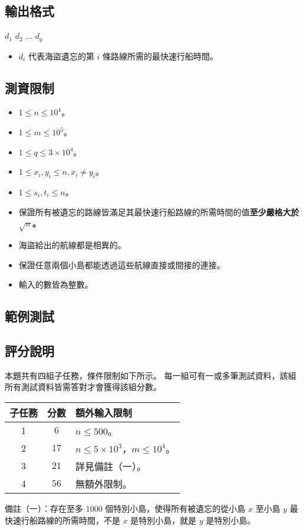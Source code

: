 \subsection{輸出格式}

\begin{format}
\f{
$d_1$ $d_2$ $\ldots$ $d_q$
}
\end{format}

\begin{itemize}
\tightlist
\item
  \(d_i\) 代表海盜遺忘的第 \(i\) 條路線所需的最快速行船時間。
\end{itemize}

\subsection{測資限制}

\begin{itemize}
\tightlist
\item
  \(1 \leq n \leq 10^4\)。
\item
  \(1 \leq m \leq 10^5\)。
\item
  \(1 \leq q \leq 3\times 10^4\)。
\item
  \(1 \leq x_i, y_i \leq n,x_i \neq y_i\)。
\item
  \(1 \leq s_i, t_i \leq n\)。
\item
  保證所有被遺忘的路線皆滿足其最快速行船路線的所需時間的值\textbf{至少嚴格大於
  \(\sqrt{n}\)。}
\item
  海盜給出的航線都是相異的。
\item
  保證任意兩個小島都能透過這些航線直接或間接的連接。
\item
  輸入的數皆為整數。
\end{itemize}

\subsection{範例測試}

\begin{example}
%
\end{example}

\subsection{評分說明}

本題共有四組子任務，條件限制如下所示。
每一組可有一或多筆測試資料，該組所有測試資料皆需答對才會獲得該組分數。

\begin{longtable}[]{@{}ccl@{}}
\toprule
子任務 & 分數 & 額外輸入限制 \\
\midrule
\endhead
1 & \(6\) & \(n \le 500\)。 \\
2 & \(17\) & \(n \le 5\times 10^3\)，\(m \le 10^4\)。 \\
3 & \(21\) & 詳見備註（一）。 \\
4 & \(56\) & 無額外限制。 \\
\bottomrule
\end{longtable}

備註（一）：存在至多 \(1000\) 個特別小島，使得所有被遺忘的從小島 \(x\)
至小島 \(y\) 最快速行船路線的所需時間，不是 \(x\) 是特別小島，就是 \(y\)
是特別小島。
